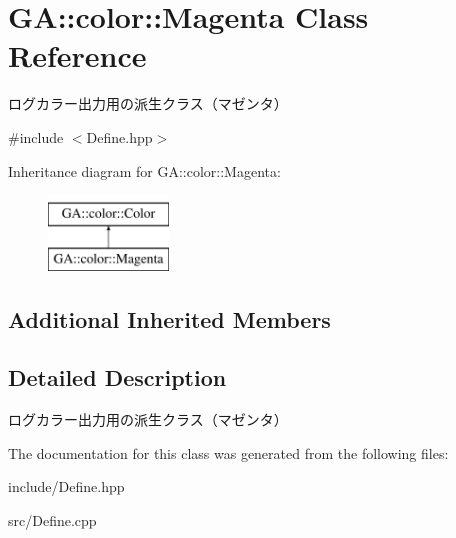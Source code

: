 \hypertarget{class_g_a_1_1color_1_1_magenta}{}\section{GA\+::color\+::Magenta Class Reference}
\label{class_g_a_1_1color_1_1_magenta}


ログカラー出力用の派生クラス（マゼンタ）  




{\ttfamily \#include $<$Define.\+hpp$>$}

Inheritance diagram for GA\+::color\+::Magenta\+:\begin{figure}[H]
\begin{center}
\leavevmode
\includegraphics[height=2.000000cm]{class_g_a_1_1color_1_1_magenta}
\end{center}
\end{figure}
\subsection*{Additional Inherited Members}


\subsection{Detailed Description}
ログカラー出力用の派生クラス（マゼンタ） 



The documentation for this class was generated from the following files\+:\begin{DoxyCompactItemize}
\item 
include/Define.\+hpp\item 
src/Define.\+cpp\end{DoxyCompactItemize}
